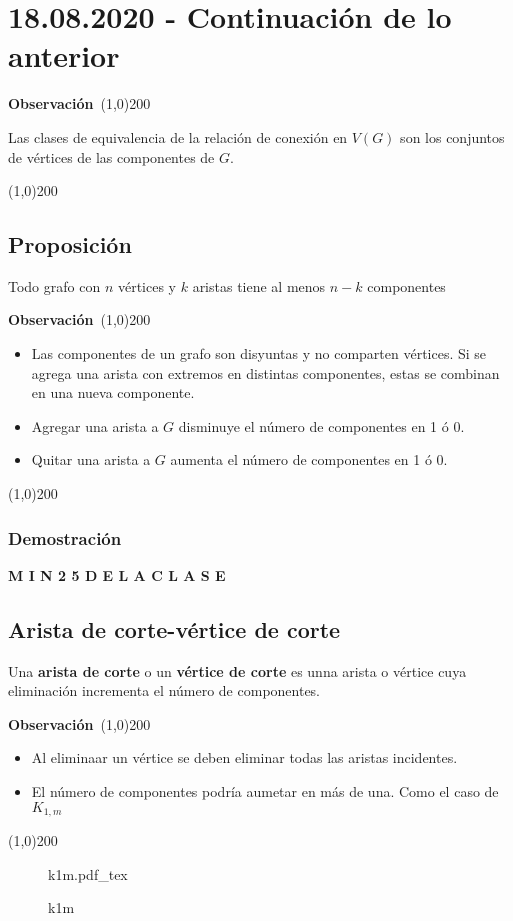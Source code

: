 \documentclass[a4paper,dvipsnames]{book}
\newcommand{\incfig}[2][1]{%
    \def\svgwidth{#1\columnwidth}
    {#2.pdf_tex}
}
\newenvironment{obs}
    {
        \begin{flushleft}
       \textbf{Observación}\
        \line(1,0){200} \
        \end{flushleft}
    }
    {
        \begin{flushright}
        \line(1,0){200}
        \end{flushright}
    }
\begin{document}
\section{18.08.2020 - Continuación de lo anterior}
\label{sec:continuacion_de_lo_anterior}

\begin{obs}
    Las clases de equivalencia de la relación de conexión en
    \(V\left(G\right)\) son los conjuntos de vértices de las componentes de
    \(G\).
\end{obs}

\subsection{Proposición}

Todo grafo con \(n\) vértices y \(k\) aristas tiene al menos \(n-k\) componentes

\begin{obs}
    \begin{itemize}
        \item Las componentes de un grafo son disyuntas y no comparten
            vértices. Si se agrega una arista con extremos en distintas
            componentes, estas se combinan en una nueva componente.
        \item Agregar una arista a \(G\) disminuye el número de componentes en 1 ó 0.
        \item Quitar una arista a \(G\) aumenta el número de componentes en 1 ó 0.
    \end{itemize}
\end{obs}

\subsubsection{Demostración}
\begin{center}
    \textbf{M I N    2 5    D E    L A    C L A S E}
\end{center}

\subsection{Arista de corte-vértice de corte}
\label{ssec:arista_de_corte_vertice_de_corte}

Una \textbf{arista de corte} o un \textbf{vértice de corte} es unna arista o
vértice cuya eliminación incrementa el número de componentes.

\begin{obs}
    \begin{itemize}
        \item  Al eliminaar un vértice se  deben eliminar todas las aristas incidentes.
        \item  El número de componentes podría aumetar en más de una. Como el caso de \(K_{1,m}\)
    \end{itemize}
\end{obs}
\begin{figure}[ht]
    \centering
    \incfig[0.5]{k1m}
    \caption{k1m}
    \label{fig:k1m}
\end{figure}
\end{document}
